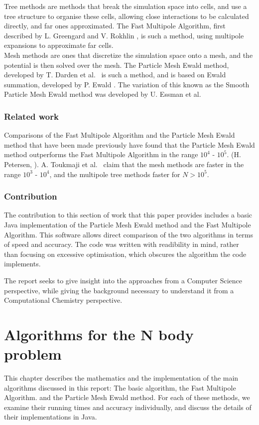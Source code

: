 \documentclass[pdftex,twoside,a4paper]{report}
\newcommand{\pmem}{Particle Mesh Ewald method}
\newcommand{\fma}{Fast Multipole Algorithm}
\begin{document}
    Tree methods are methods that break the simulation space into cells, and use a tree structure to organise these cells, allowing close interactions to be calculated directly, and far ones approximated. The \fma{}, first described by L. Greengard and V. Rokhlin \cite{greengard:315}, is such a method, using multipole expansions to approximate far cells.\\
    
    Mesh methods are ones that discretize the simulation space onto a mesh, and the potential is then solved over the mesh. The \pmem{}, developed by T. Darden et al.\ \cite{darden:10089} is such a method, and is based on Ewald summation, developed by P. Ewald \cite{ewald}. The variation of this known as the Smooth \pmem{} was developed by U. Essman et al.\ \cite{essmann:8577}\\
    \subsection{Related work}
    Comparisons of the \fma{} and the \pmem{} that have been made previously have found that the \pmem{} outperforms the \fma{} in the range $10^4$ - $10^5$. (H. Petersen, \cite{petersen:3668}). A. Toukmaji et al.\ \cite{toukmaji:73} claim that the mesh methods are faster in the range $10^3$ - $10^4$, and the multipole tree methods faster for $N > 10^5$.
    \subsection{Contribution}
    The contribution to this section of work that this paper provides includes a basic Java implementation of the \pmem{} and the \fma{}. This software allows direct comparison of the two algorithms in terms of speed and accuracy. The code was written with readibility in mind, rather than focusing on excessive optimisation, which obscures the algorithm the code implements.
    
    The report seeks to give insight into the approaches from a Computer Science perspective, while giving the background necessary to understand it from a Computational Chemistry perspective.
    
    
    

\chapter{Algorithms for the N body problem}
This chapter describes the mathematics and the implementation of the main algorithms discussed in this report: The basic algorithm, the \fma{}. and the \pmem{}. For each of these methods, we examine their running times and accuracy individually, and discuss the details of their implementations in Java.
\end{document}
